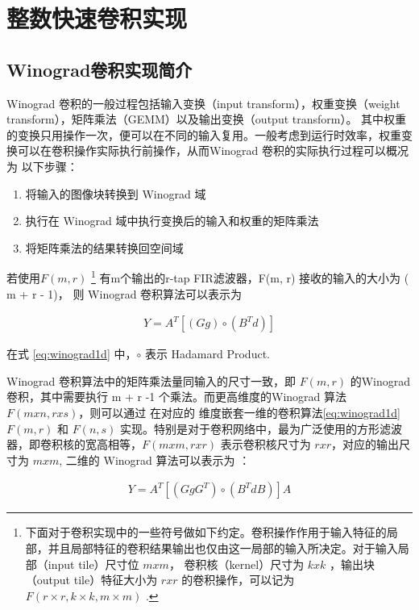 
\chapter{整数快速卷积实现}
\label{cha:chapter03}

\section{Winograd卷积实现简介}

Winograd 卷积的一般过程包括输入变换（input transform），权重变换（weight transform），矩阵乘法（GEMM）以及输出变换（output transform）。
其中权重的变换只用操作一次，便可以在不同的输入复用。一般考虑到运行时效率，权重变换可以在卷积操作实际执行前操作，从而Winograd 卷积的实际执行过程可以概况为
以下步骤：
\begin{enumerate}
  \item 将输入的图像块转换到 Winograd 域
  \item 执行在 Winograd 域中执行变换后的输入和权重的矩阵乘法
  \item 将矩阵乘法的结果转换回空间域
\end{enumerate}

若使用$F(m, r)$ 
 \footnote{下面对于卷积实现中的一些符号做如下约定。卷积操作作用于输入特征的局部，并且局部特征的卷积结果输出也仅由这一局部的输入所决定。对于输入局部（input tile）尺寸位 $m x m $，
 卷积核（kernel）尺寸为 $k x k$ ，输出块（output tile）特征大小为 $ r x r $ 的卷积操作，可以记为 $ F(r\times r, k\times k, m\times m) $ .}
有m个输出的r-tap FIR滤波器，F(m, r) 接收的输入的大小为 ( m + r - 1)， 则 Winograd 卷积算法可以表示为

\begin{align}
\label{eq:winograd1d}
  Y = A^T [(Gg) \circ (B^Td)]
\end{align}

在式 \ref{eq:winograd1d} 中，$\circ$ 表示 Hadamard Product.

Winograd 卷积算法中的矩阵乘法量同输入的尺寸一致，即 $F(m, r)$ 的Winograd 卷积，其中需要执行 m + r -1 个乘法。而更高维度的Winograd 算法 $F(mxn, rxs)$，则可以通过
在对应的 维度嵌套一维的卷积算法\ref{eq:winograd1d} $F(m, r)$ 和 $F(n, s)$ 实现。特别是对于卷积网络中，最为广泛使用的方形滤波器，即卷积核的宽高相等，$F(m x m, r x r)$
表示卷积核尺寸为 $r x r$，对应的输出尺寸为 $ m x m$, 二维的 Winograd 算法可以表示为 ：

\begin{align}
\label{eq:winograd2d}
  Y = A^T [(GgG^T) \circ (B^TdB)] A
\end{align}

